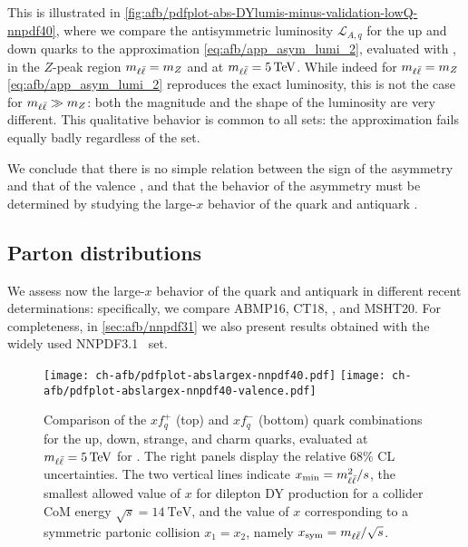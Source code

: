 This is illustrated in
\cref{fig:afb/pdfplot-abs-DYlumis-minus-validation-lowQ-nnpdf40}, where we
compare the antisymmetric luminosity $\mathcal{L}_{A,q}$ for the up and down
quarks  to the approximation \cref{eq:afb/app_asym_lumi_2}, evaluated with
 \nnlo, in the $Z$-peak region $m_{\ell\bar{\ell}}=m_Z$  and at
$\mll=\SI{5}{\tera\electronvolt}$.
%
While indeed for $m_{\ell\bar{\ell}}=m_Z$ \cref{eq:afb/app_asym_lumi_2} reproduces the exact
luminosity, this is not the case for $m_{\ell\bar{\ell}}\gg m_Z$: both the magnitude and the
shape of the luminosity are  very different.
%
This qualitative behavior is common to all \pdf sets: the approximation fails
equally badly regardless of the \pdf set.

We conclude that there is no simple relation between the sign of the asymmetry
and that of the valence \pdf, and that the behavior of the asymmetry must be
determined by studying the large-$x$ behavior of the quark and antiquark \pdfs.

\subsection{Parton distributions}
\label{sec:afb/subsec-largexPDFs}

We assess now the large-$x$ behavior of the quark and antiquark \pdfs in
different recent \pdf determinations: specifically, we compare ABMP16, CT18, 
, and MSHT20.
%
For completeness, in \cref{sec:afb/nnpdf31} we also present results obtained
with the widely used NNPDF3.1~\cite{Ball:2017nwa} set.

\begin{figure}[!t]
  \centering
  \texttt{[image: ch-afb/pdfplot-abslargex-nnpdf40.pdf]}
  \texttt{[image: ch-afb/pdfplot-abslargex-nnpdf40-valence.pdf]}
  \caption{\small
    Comparison of the $xf^+_q$ (top) and $xf_q^-$ (bottom) quark \pdf
    combinations for the up, down, strange, and charm quarks, evaluated at
    $\mll=\SI{5}{\tera\electronvolt}$ for  \nnlo.
    The right panels display the relative 68\% CL uncertainties.
    The two vertical lines indicate $x_{\text{min}}=m_{\ell\bar{\ell}}^2/s$, the smallest
    allowed value of $x$  for dilepton DY production for a collider CoM energy
    $\sqrt{s}=\SI{14}{\tera\electronvolt}$, and the value of $x$ corresponding
    to a symmetric partonic collision $x_1=x_2$, namely
    $x_{\text{sym}}=m_{\ell\bar{\ell}}/\sqrt{s}$.
  }    
  \label{fig:afb/pdfplot-abslargex}
\end{figure}


